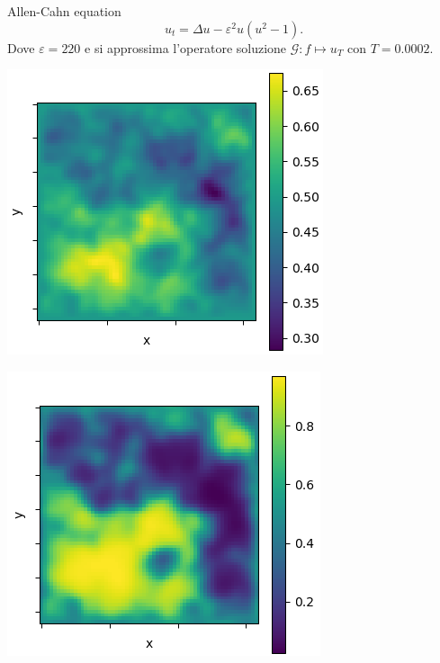\documentclass[aspectratio=169]{beamer}
\begin{document}
\begin{frame}[t]{Allen-Cahn equation}
    \[
        u_{t} = \Delta u - \varepsilon^{2} u (u^{2}-1).
    \]
    Dove $\varepsilon = 220 $ e si approssima l'operatore soluzione $\mathcal{G}: f\mapsto u_{T}$ con $T = 0.0002$.
    \begin{center}
        \begin{minipage}{0.24\textwidth}
            \includegraphics[width=\textwidth]{operators/allen/input.png}
        \end{minipage}
        \hfill
        \begin{minipage}{0.24\textwidth}
            \includegraphics[width=\textwidth]{operators/allen/output.png}

\end{minipage}
\end{center}
\end{frame}
\end{document}
